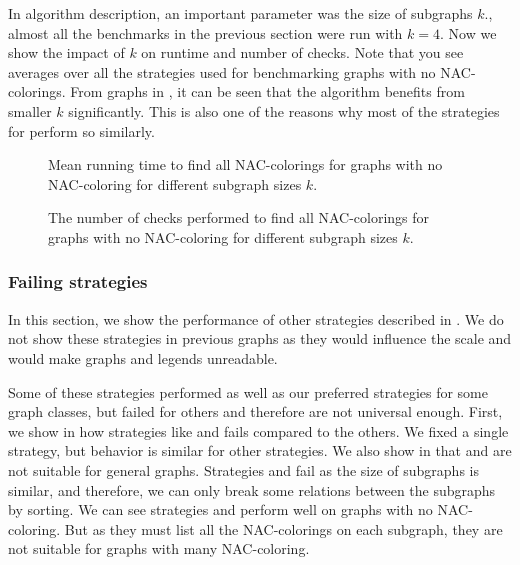 In \Subgraphs{} algorithm description, an important parameter was the size of subgraphs \( k \).,
almost all the benchmarks in the previous section were run with \( k = 4 \).
Now we show the impact of	\( k \) on runtime and number of checks.
Note that you see averages over all the strategies used for benchmarking
graphs with no NAC-colorings.
From graphs in ,
it can be seen that the algorithm benefits from smaller \( k \) significantly.
This is also one of the reasons why most of
the strategies for \Subgraphs{} perform so similarly.

\begin{figure}[p]
	\centering
	\scalebox{0.5}{}
	\caption[Mean runtime for graphs with no NAC-coloring.]{
		Mean running time to find all NAC-colorings for graphs with no NAC-coloring for different subgraph sizes \( k \).}%
	\label{fig:graph_no_nac_coloring_first_runtime_subgraph_size}
\end{figure}%
\begin{figure}[p]
	\centering
	\scalebox{0.5}{}
	\caption[Checks performed for graphs with no NAC-coloring.]{
		The number of checks performed to find all NAC-colorings for graphs with no NAC-coloring for different subgraph sizes \( k \).}%
	\label{fig:graph_no_nac_coloring_first_checks_subgraph_size}
\end{figure}%



\subsubsection{Failing strategies}%
\label{sec:failing_strategies}

In this section, we show the performance of other strategies described in .
We do not show these strategies in previous graphs as they would influence
the scale and would make graphs and legends unreadable.

Some of these strategies performed as well as our preferred strategies for some graph classes,
but failed for others and therefore are not universal enough.
First, we show in 
how strategies like \Log{} and \PromisingCycles{} fails compared to the others.
We fixed a single strategy, but behavior is similar for other strategies.
We also show in 
that \KernighanLin{} and \Cuts{} are not suitable for general graphs.
%
Strategies \SortedBits{} and \MinMax{} fail as the size of subgraphs is similar,
and therefore, we can only break some relations between the subgraphs by sorting.
%
We can see strategies \SortedSize{} and \Score{} perform well
on graphs with no NAC-coloring. But as they must list all the NAC-colorings
on each subgraph, they are not suitable for graphs with many NAC-coloring.

